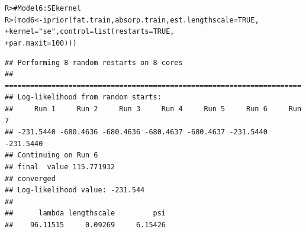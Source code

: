\documentclass[showframe,11pt]{report}\usepackage[]{graphicx}\usepackage[]{color}
\makeatletter
\newcommand{\hlnum}[1]{\textcolor[rgb]{0.063,0.58,0.627}{#1}}%
\newcommand{\hlstr}[1]{\textcolor[rgb]{0.063,0.58,0.627}{#1}}%
\newcommand{\hlcom}[1]{\textcolor[rgb]{0.588,0.588,0.588}{#1}}%
\newcommand{\hlstd}[1]{\textcolor[rgb]{0.196,0.196,0.196}{#1}}%
\newcommand{\hlkwb}[1]{\textcolor[rgb]{0.627,0,0.314}{#1}}%
\newcommand{\hlkwc}[1]{\textcolor[rgb]{0,0.631,0.314}{#1}}%
\newcommand{\hlkwd}[1]{\textcolor[rgb]{0.78,0.227,0.412}{#1}}%
\newenvironment{kframe}{%
 \def\at@end@of@kframe{}%
 \ifinner\ifhmode%
  \def\at@end@of@kframe{\end{minipage}}%
  \begin{minipage}{\columnwidth}%
 \fi\fi%
 \def\FrameCommand##1{\hskip\@totalleftmargin \hskip-\fboxsep
 \colorbox{shadecolor}{##1}\hskip-\fboxsep
     \hskip-\linewidth \hskip-\@totalleftmargin \hskip\columnwidth}%
 \MakeFramed {\advance\hsize-\width
   \@totalleftmargin\z@ \linewidth\hsize
   \@setminipage}}%
 {\par\unskip\endMakeFramed%
 \at@end@of@kframe}
\newenvironment{knitrout}{}{} %
\makeatother
\begin{document}
\begin{knitrout}
\color{fgcolor}\begin{kframe}
\begin{alltt}
\hlstd{R> }\hlcom{# Model 6: SE kernel}
\hlstd{R> }\hlstd{(mod6} \hlkwb{<-} \hlkwd{iprior}\hlstd{(fat.train, absorp.train,} \hlkwc{est.lengthscale} \hlstd{=} \hlnum{TRUE}\hlstd{,}
\hlstd{+  }                \hlkwc{kernel} \hlstd{=} \hlstr{"se"}\hlstd{,} \hlkwc{control} \hlstd{=} \hlkwd{list}\hlstd{(}\hlkwc{restarts} \hlstd{=} \hlnum{TRUE}\hlstd{,}
\hlstd{+  }                                              \hlkwc{par.maxit} \hlstd{=} \hlnum{100}\hlstd{)))}
\end{alltt}
\begin{verbatim}
## Performing 8 random restarts on 8 cores
## ======================================================================
## Log-likelihood from random starts:
##     Run 1     Run 2     Run 3     Run 4     Run 5     Run 6     Run 7 
## -231.5440 -680.4636 -680.4636 -680.4637 -680.4637 -231.5440 -231.5440 
## Continuing on Run 6 
## final  value 115.771932 
## converged
## Log-likelihood value: -231.544 
## 
##      lambda lengthscale         psi 
##    96.11515     0.09269     6.15426
\end{verbatim}
\end{kframe}
\end{knitrout}
\end{document}
